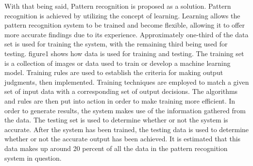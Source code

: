 \documentclass[10pt,twocolumn]{article}
\begin{document}
	With that being said, Pattern recognition is proposed as a solution. Pattern recognition is achieved by utilizing the concept of learning. Learning allows the pattern recognition system to be trained and become flexible, allowing it to offer more accurate findings due to its experience. Approximately one-third of the data set is used for training the system, with the remaining third being used for testing. figure1 shows how data is used for training and testing. The training set is a collection of images or data used to train or develop a machine learning model. Training rules are used to establish the criteria for making output judgments, then implemented. Training techniques are employed to match a given set of input data with a corresponding set of output decisions. The algorithms and rules are then put into action in order to make training more efficient. In order to generate results, the system makes use of the information gathered from the data. The testing set is used to determine whether or not the system is accurate. After the system has been trained, the testing data is used to determine whether or not the accurate output has been achieved. It is estimated that this data makes up around 20 percent of all the data in the pattern recognition system in question.
\end{document}
